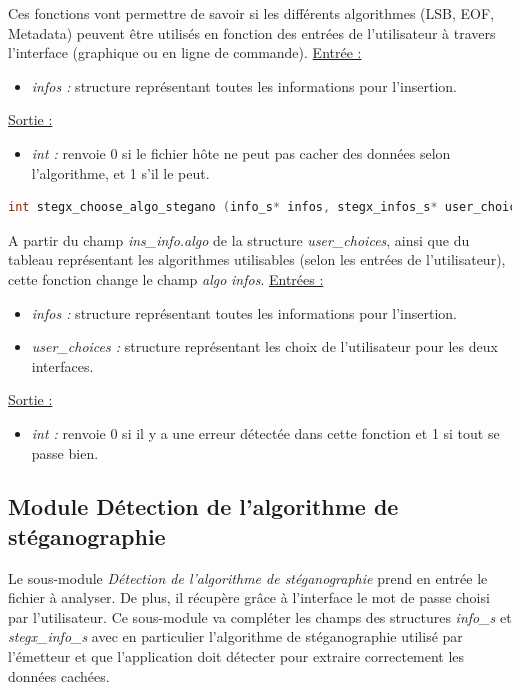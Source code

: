 \documentclass[11pt]{article}
\begin{document}
Ces fonctions vont permettre de savoir si les différents algorithmes 
(LSB, EOF, Metadata) peuvent être utilisés en fonction des entrées 
de l'utilisateur à travers l'interface (graphique ou en ligne de commande). 
\newline
\underline{Entrée :} 
\begin{itemize}
\item \textit{infos :} structure représentant toutes les informations pour 
l'insertion.  
\end{itemize}
\underline{Sortie :} 
\begin{itemize}
\item \textit{int :} renvoie 0 si le fichier hôte ne peut pas cacher des 
données selon l'algorithme, et 1 s'il le peut. 
\newline 
\end{itemize}

\begin{lstlisting}[language=c]
int stegx_choose_algo_stegano (info_s* infos, stegx_infos_s* user_choices); 
\end{lstlisting}

A partir du champ \textit{ins\_info.algo} de la structure \textit{user\_choices}, 
ainsi que du tableau représentant les algorithmes utilisables (selon les 
entrées de l'utilisateur), cette fonction change le champ \textit{algo} 
\textit{infos}. 
\newline
\underline{Entrées :} 
\begin{itemize}
\item \textit{infos :} structure représentant toutes les informations pour 
l'insertion.  
\item \textit{user\_choices :} structure représentant les choix de 
l'utilisateur pour les deux interfaces. 
\end{itemize}
\underline{Sortie :} 
\begin{itemize}
\item \textit{int :} renvoie 0 si il y a une erreur détectée dans cette 
fonction et 1 si tout se passe bien.  
\newline 
\end{itemize}

\subsection{Module Détection de l'algorithme de
stéganographie}

Le sous-module \textit{Détection de l'algorithme de stéganographie} prend en 
entrée le fichier à analyser. De plus, il récupère grâce à l'interface le 
mot de passe choisi par l'utilisateur.  
Ce sous-module va compléter les champs des structures \textit{info\_s} 
et \textit{stegx\_info\_s} avec en particulier l'algorithme de stéganographie 
utilisé par l'émetteur et que l'application doit détecter pour extraire 
correctement les données cachées. 
\end{document}
